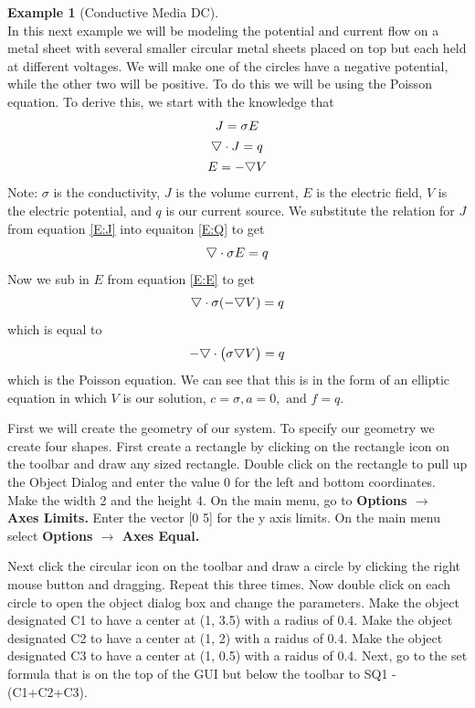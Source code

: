 \documentclass{amsart}
\theoremstyle{definition}
\newtheorem{example}{Example}
\begin{document}
\begin{example}[Conductive Media DC] \hfill \\
\indent
In this next example we will be modeling the potential and current flow on a metal sheet with several smaller circular metal sheets placed on top but each held at different voltages.  We will make one of the circles have a negative potential, while the other two will be positive.  To do this we will be using the Poisson equation. To derive this, we start with the knowledge that 
\begin{gather}
J = \sigma E         \label{E:J} \\
\raisebox{.4ex}{$\bigtriangledown$} \cdot J = q        \label{E:Q} \\
E = -\raisebox{.4ex}{$\bigtriangledown$} V           \label{E:E}
\end{gather}
Note: $\sigma$ is the conductivity, $J$ is the volume current, $E$ is the electric field, $V$ is the electric potential, and $q$ is our current source. We substitute the relation for $J$ from equation \eqref{E:J} into equaiton \eqref{E:Q} to get
\[
\raisebox{.4ex}{$\bigtriangledown$} \cdot \sigma E = q
\]
Now we sub in $E$ from equation \eqref{E:E} to get
\[
\raisebox{.4ex}{$\bigtriangledown$} \cdot \sigma (-\raisebox{.4ex}{$\bigtriangledown$} V) = q
\]
which is equal to 
\begin{equation}
-\raisebox{.4ex}{$\bigtriangledown$} \cdot \left( \sigma \raisebox{.4ex}{$\bigtriangledown$} V \right)= q     \label{E:Poisson}
\end{equation}
which is the Poisson equation. We can see that this is in the form of an elliptic equation in which $V$ is our solution, $c = \sigma, a = 0, \text{ and } f = q$.

First we will create the geometry of our system. To specify our geometry we create four shapes. First create a rectangle by clicking on the rectangle icon on the toolbar and draw any sized rectangle. Double click on the rectangle to pull up the Object Dialog and enter the value 0 for the left and bottom coordinates. Make the width 2 and the height 4. On the main menu, go to \textbf{Options $\to$ Axes Limits.} Enter the vector [0 5] for the y axis limits. On the main menu select \textbf{Options $\to$ Axes Equal.}

Next click the circular icon on the toolbar and draw a circle by clicking the right mouse button and dragging. Repeat this three times. Now double click on each circle to open the object dialog box and change the parameters. Make the object designated C1 to have a center at (1, 3.5) with a radius of 0.4. Make the object designated C2 to have a center at (1, 2) with a raidus of 0.4. Make the object designated C3 to have a center at (1, 0.5) with a raidus of 0.4. Next, go to the set formula that is on the top of the GUI but below the toolbar to SQ1 - (C1+C2+C3).


\end{example}
\end{document}
